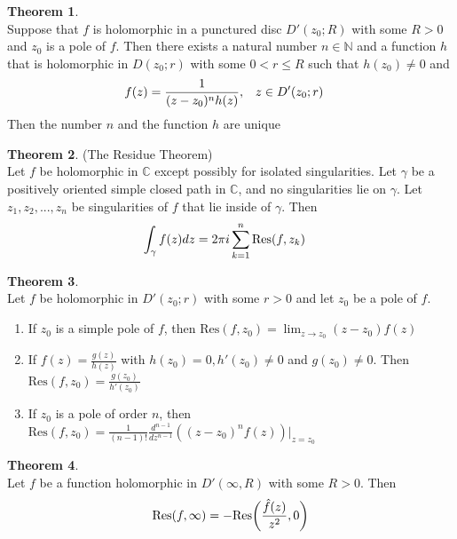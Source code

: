 \documentclass[letterpaper, 11pt]{article}
\newcommand{\C}{\mathbb{C}}   %
\newcommand{\N}{\mathbb{N}}   %
\newcommand{\1}{\mathds{1}}	%
\theoremstyle{definition}
\newtheorem{theorem}{Theorem}[section]
\begin{document}
\begin{theorem} ~\\
Suppose that $f$ is holomorphic in a punctured disc $D'(z_0; R)$ with some $R>0$ and $z_0$ is a pole of $f$. Then there exists a natural number $n \in \N$ and a function $h$ that is holomorphic in $D(z_0; r)$ with some $0 < r \le R$ such that $h(z_0) \ne 0$ and 
\begin{align}
f(z) = \frac{1}{(z-z_0)^n h(z)}, & \ \ \ z \in D'(z_0; r) \notag
\end{align}
Then the number $n$ and the function $h$ are unique
\end{theorem}

\begin{theorem} (The Residue Theorem) \\
Let $f$ be holomorphic in $\C$ except possibly for isolated singularities. Let $\gamma$ be a positively oriented simple closed path in $\C$, and no singularities lie on $\gamma$. Let $z_1, z_2, ..., z_n$ be singularities of $f$ that lie inside of $\gamma$. Then
\begin{align}
\int _{\gamma} f(z)dz = 2 \pi i & \sum _{k=1} ^n \text{Res}(f, z_k) \notag
\end{align}
\end{theorem}

\begin{theorem} ~\\
Let $f$ be holomorphic in $D'(z_0; r)$ with some $r > 0$ and let $z_0$ be a pole of $f$.
\begin{enumerate}
\item If $z_0$ is a simple pole of $f$, then $\text{Res}(f, z_0) = \lim _{z \to z_0} (z-z_0)f(z)$
\item If $f(z) = \frac{g(z)}{h(z)}$ with $h(z_0) = 0, h'(z_0) \ne 0$ and $g(z_0) \ne 0$. Then $\text{Res}(f, z_0) = \frac{g(z_0)}{h'(z_0)}$
\item If $z_0$ is a pole of order $n$, then $\text{Res}(f, z_0) = \frac{1}{(n-1)!} \frac{d^{n-1}}{dz^{n-1}}((z-z_0)^n f(z)) \vert _{z=z_0}$
\end{enumerate}
\end{theorem}

\begin{theorem} ~\\
Let $f$ be a function holomorphic in $D'(\infty, R)$ with some $R > 0$. Then 
\begin{align}
\text{Res}(f, \infty) = -\text{Res}\bigg(\frac{\hat{f}(z)}{z^2}, 0\bigg) \notag
\end{align}

\end{theorem}
\end{document}
